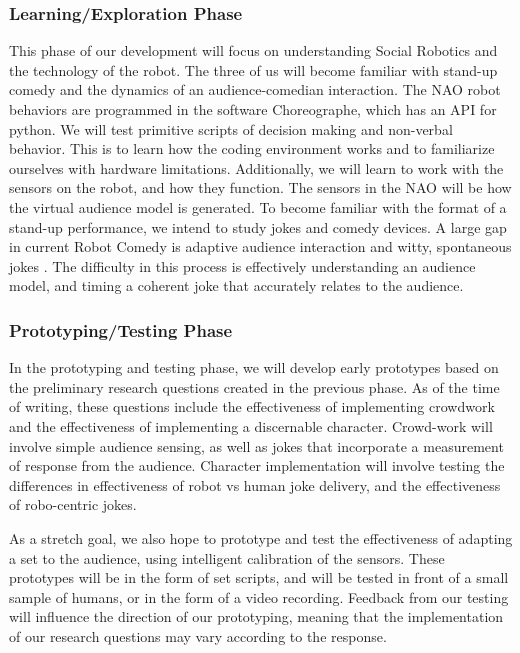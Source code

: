 \documentclass[onecolumn, draftclsnofoot,10pt, compsoc]{IEEEtran}
\begin{document}
\subsubsection{Learning/Exploration Phase}
This phase of our development will focus on understanding Social Robotics and the technology of the robot. The three of us will become familiar with stand-up comedy and the dynamics of an audience-comedian interaction. The NAO robot behaviors are programmed in the software Choreographe, which has an API for python. We will test primitive scripts of decision making and non-verbal behavior. This is to learn how the coding environment works and to familiarize ourselves with hardware limitations. Additionally, we will learn to work with the sensors on the robot, and how they function. The sensors in the NAO will be how the virtual audience model is generated. To become familiar with the format of a stand-up performance, we intend to study jokes and comedy devices. A large gap in current Robot Comedy is adaptive audience interaction and witty, spontaneous jokes \cite{KatevasRobot:2014}. The difficulty in this process is effectively understanding an audience model, and timing a coherent joke that accurately relates to the audience.

\subsubsection{Prototyping/Testing Phase}
In the prototyping and testing phase, we will develop early prototypes based on the preliminary research questions created in the previous phase. As of the time of writing, these questions include the effectiveness of implementing crowdwork and the effectiveness of implementing a discernable character. Crowd-work will involve simple audience sensing, as well as jokes that incorporate a measurement of response from the audience. Character implementation will involve testing the differences in effectiveness of robot vs human joke delivery, and the effectiveness of robo-centric jokes.

As a stretch goal, we also hope to prototype and test the effectiveness of adapting a set to the audience, using intelligent calibration of the sensors. These prototypes will be in the form of set scripts, and will be tested in front of a small sample of humans, or in the form of a video recording. Feedback from our testing will influence the direction of our prototyping, meaning that the implementation of our research questions may vary according to the response.
\end{document}
